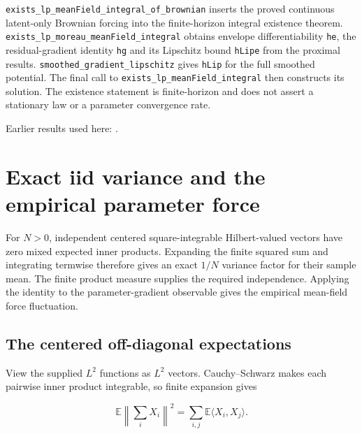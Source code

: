 \documentclass[11pt,a4paper]{report}
\begin{document}
\begin{leanbox}
\texttt{exists\_\allowbreak{}lp\_\allowbreak{}mean\allowbreak{}Field\_\allowbreak{}integral\_\allowbreak{}of\_\allowbreak{}brownian} inserts the proved continuous latent-only Brownian forcing into the finite-horizon integral existence theorem. \texttt{exists\_\allowbreak{}lp\_\allowbreak{}moreau\_\allowbreak{}mean\allowbreak{}Field\_\allowbreak{}integral} obtains envelope differentiability \texttt{he}, the residual-gradient identity \texttt{hg} and its Lipschitz bound \texttt{h\allowbreak{}Lipe} from the proximal results. \texttt{smoothed\_\allowbreak{}gradient\_\allowbreak{}lipschitz} gives \texttt{h\allowbreak{}Lip} for the full smoothed potential. The final call to \texttt{exists\_\allowbreak{}lp\_\allowbreak{}mean\allowbreak{}Field\_\allowbreak{}integral} then constructs its solution. The existence statement is finite-horizon and does not assert a stationary law or a parameter convergence rate.
\end{leanbox}


Earlier results used here: \cite[Section~3.1.1]{LangevinLean2026IPLA}.
\section{\texorpdfstring{Exact iid variance and the empirical parameter force}{Exact iid variance and the empirical parameter force}}
\label{proof-module-ProximalLangevin-MeanFieldVariance-lean}


For \(N>0\), independent centered square-integrable Hilbert-valued vectors have zero mixed expected inner products. Expanding the finite squared sum and integrating termwise therefore gives an exact \(1/N\) variance factor for their sample mean. The finite product measure supplies the required independence. Applying the identity to the parameter-gradient observable gives the empirical mean-field force fluctuation.

\subsection{\texorpdfstring{The centered off-diagonal expectations}{The centered off-diagonal expectations}}
\label{report-step-ProximalLangevin-MeanFieldVariance-lean-1}


View the supplied \(L^2\) functions as \(L^2\) vectors. Cauchy–Schwarz makes each pairwise inner product integrable, so finite expansion gives

\[\mathbb E\left\|\sum_iX_i\right\|^2=\sum_{i,j}\mathbb E\langle X_i,X_j\rangle.\]
\end{document}
